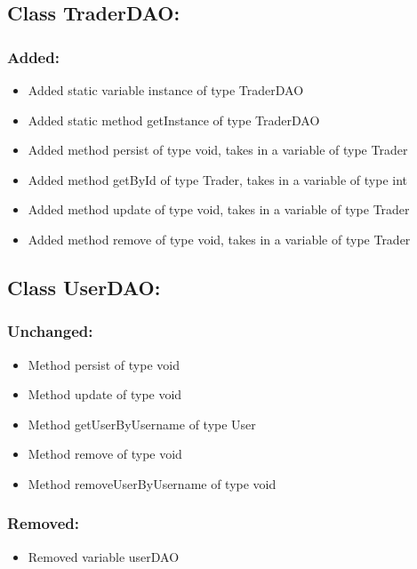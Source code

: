 \documentclass{article}
\begin{document}

\subsection{Class TraderDAO:}

\subsubsection{Added:}
\begin{itemize}
\item Added static variable instance of type TraderDAO
\item Added static method getInstance of type TraderDAO
\item Added method persist of type void, takes in a variable of type Trader
\item Added method getById of type Trader, takes in a variable of type int
\item Added method update of type void, takes in a variable of type Trader
\item Added method remove of type void, takes in a variable of type Trader
\end{itemize}


\subsection{Class UserDAO:}

\subsubsection{Unchanged:}
\begin{itemize}
\item Method persist of type void
\item Method update of type void
\item Method getUserByUsername of type User
\item Method remove of type void
\item Method removeUserByUsername of type void
\end{itemize}

\subsubsection{Removed:}
\begin{itemize}
\item Removed variable userDAO
\end{itemize}
\end{document}
